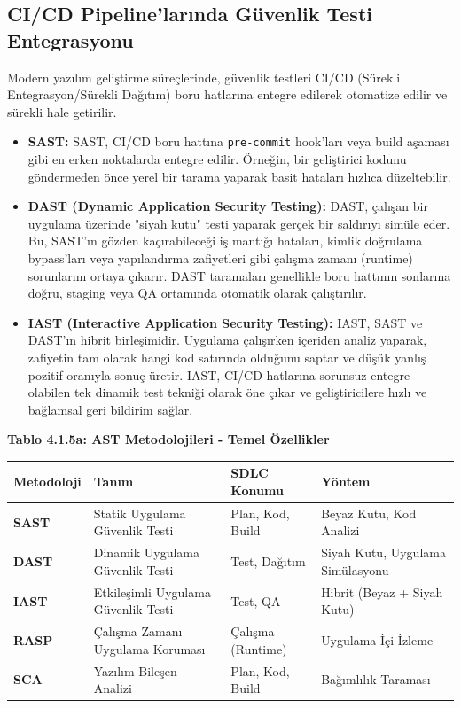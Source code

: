 \subsection{CI/CD Pipeline'larında Güvenlik Testi Entegrasyonu}
Modern yazılım geliştirme süreçlerinde, güvenlik testleri CI/CD (Sürekli Entegrasyon/Sürekli Dağıtım) boru hatlarına entegre edilerek otomatize edilir ve sürekli hale getirilir.
\begin{itemize}
\item \textbf{SAST:} SAST, CI/CD boru hattına \texttt{pre-commit} hook'ları veya build aşaması gibi en erken noktalarda entegre edilir. Örneğin, bir geliştirici kodunu göndermeden önce yerel bir tarama yaparak basit hataları hızlıca düzeltebilir.
\item \textbf{DAST (Dynamic Application Security Testing):} DAST, çalışan bir uygulama üzerinde "siyah kutu" testi yaparak gerçek bir saldırıyı simüle eder. Bu, SAST'ın gözden kaçırabileceği iş mantığı hataları, kimlik doğrulama bypass'ları veya yapılandırma zafiyetleri gibi çalışma zamanı (runtime) sorunlarını ortaya çıkarır. DAST taramaları genellikle boru hattının sonlarına doğru, staging veya QA ortamında otomatik olarak çalıştırılır.
\item \textbf{IAST (Interactive Application Security Testing):} IAST, SAST ve DAST'ın hibrit birleşimidir. Uygulama çalışırken içeriden analiz yaparak, zafiyetin tam olarak hangi kod satırında olduğunu saptar ve düşük yanlış pozitif oranıyla sonuç üretir. IAST, CI/CD hatlarına sorunsuz entegre olabilen tek dinamik test tekniği olarak öne çıkar ve geliştiricilere hızlı ve bağlamsal geri bildirim sağlar.
\end{itemize}
\textbf{Tablo 4.1.5a: AST Metodolojileri - Temel Özellikler}

\begin{tabular}{|p{2cm}|p{5cm}|p{3cm}|p{3cm}|}
\hline
\textbf{Metodoloji} & \textbf{Tanım} & \textbf{SDLC Konumu} & \textbf{Yöntem} \\
\hline
\textbf{SAST} & Statik Uygulama Güvenlik Testi & Plan, Kod, Build & Beyaz Kutu, Kod Analizi \\
\hline
\textbf{DAST} & Dinamik Uygulama Güvenlik Testi & Test, Dağıtım & Siyah Kutu, Uygulama Simülasyonu \\
\hline
\textbf{IAST} & Etkileşimli Uygulama Güvenlik Testi & Test, QA & Hibrit (Beyaz + Siyah Kutu) \\
\hline
\textbf{RASP} & Çalışma Zamanı Uygulama Koruması & Çalışma (Runtime) & Uygulama İçi İzleme \\
\hline
\textbf{SCA} & Yazılım Bileşen Analizi & Plan, Kod, Build & Bağımlılık Taraması \\
\hline
\end{tabular}

